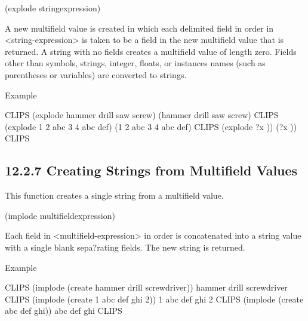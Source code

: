 \documentclass[letterpaper,10pt,english]{sphinxmanual}
\begin{document}

\begin{sphinxVerbatim}[commandchars=\\\{\}]
(explode\PYGZdl{} \PYGZlt{}string\PYGZhy{}expression\PYGZgt{})
\end{sphinxVerbatim}

A new multifield value is created in which each delimited field in order
in \textless{}string-expression\textgreater{} is taken to be a field in the new multifield
value that is returned. A string with no fields creates a multifield
value of length zero. Fields other than symbols, strings, integer,
floats, or instances names (such as parentheses or variables) are
converted to strings.

Example

\begin{sphinxVerbatim}[commandchars=\\\{\}]
CLIPS\PYGZgt{} (explode\PYGZdl{} \PYGZdq{}hammer drill saw screw\PYGZdq{})
(hammer drill saw screw)
CLIPS\PYGZgt{} (explode\PYGZdl{} \PYGZdq{}1 2 abc 3 4 \PYGZbs{}\PYGZbs{}\PYGZdq{}abc\PYGZbs{}\PYGZdq{} \PYGZbs{}\PYGZbs{}\PYGZdq{}def\PYGZbs{}\PYGZdq{}\PYGZdq{})
(1 2 abc 3 4 \PYGZdq{}abc\PYGZdq{} \PYGZdq{}def\PYGZdq{})
CLIPS\PYGZgt{} (explode\PYGZdl{} \PYGZdq{}?x \PYGZti{} )\PYGZdq{})
(\PYGZdq{}?x\PYGZdq{} \PYGZdq{}\PYGZti{}\PYGZdq{} \PYGZdq{})\PYGZdq{})
CLIPS\PYGZgt{}
\end{sphinxVerbatim}


\subsection{12.2.7 Creating Strings from Multifield Values}
\label{\detokenize{actions:creating-strings-from-multifield-values}}
This function creates a single string from a multifield value.


\begin{sphinxVerbatim}[commandchars=\\\{\}]
(implode\PYGZdl{} \PYGZlt{}multifield\PYGZhy{}expression\PYGZgt{})
\end{sphinxVerbatim}

Each field in \textless{}multifield-expression\textgreater{} in order is concatenated into a
string value with a single blank sepa?rating fields. The new string is
returned.

Example

\begin{sphinxVerbatim}[commandchars=\\\{\}]
CLIPS\PYGZgt{} (implode\PYGZdl{} (create\PYGZdl{} hammer drill screwdriver))
\PYGZdq{}hammer drill screwdriver\PYGZdq{}
CLIPS\PYGZgt{} (implode\PYGZdl{} (create\PYGZdl{} 1 \PYGZdq{}abc\PYGZdq{} def \PYGZdq{}ghi\PYGZdq{} 2))
\PYGZdq{}1 \PYGZdq{}abc\PYGZdq{} def \PYGZdq{}ghi\PYGZdq{} 2\PYGZdq{}
CLIPS\PYGZgt{} (implode\PYGZdl{} (create\PYGZdl{} \PYGZdq{}abc def ghi\PYGZdq{}))
\PYGZdq{}\PYGZdq{}abc def ghi\PYGZdq{}\PYGZdq{}
CLIPS\PYGZgt{}
\end{sphinxVerbatim}
\end{document}
